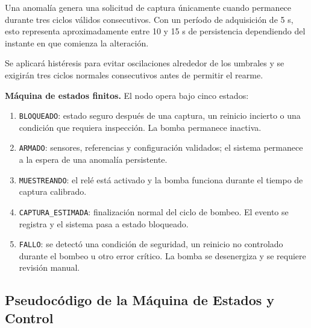 \documentclass[11pt,a4paper]{article}
\begin{document}
Una anomalía genera una solicitud de captura únicamente cuando permanece durante tres ciclos válidos consecutivos. Con un período de adquisición de 5 s, esto representa aproximadamente entre 10 y 15 s de persistencia dependiendo del instante en que comienza la alteración.

Se aplicará histéresis para evitar oscilaciones alrededor de los umbrales y se exigirán tres ciclos normales consecutivos antes de permitir el rearme.

\textbf{Máquina de estados finitos.} El nodo opera bajo cinco estados:

\begin{enumerate}

    \item \texttt{BLOQUEADO}: estado seguro después de una captura, un reinicio incierto o una condición que requiera inspección. La bomba permanece inactiva.

    \item \texttt{ARMADO}: sensores, referencias y configuración validados; el sistema permanece a la espera de una anomalía persistente.

    \item \texttt{MUESTREANDO}: el relé está activado y la bomba funciona durante el tiempo de captura calibrado.

    \item \texttt{CAPTURA\_ESTIMADA}: finalización normal del ciclo de bombeo. El evento se registra y el sistema pasa a estado bloqueado.

    \item \texttt{FALLO}: se detectó una condición de seguridad, un reinicio no controlado durante el bombeo u otro error crítico. La bomba se desenergiza y se requiere revisión manual.

\end{enumerate}

\clearpage
\subsection{Pseudocódigo de la Máquina de Estados y Control}
\end{document}
